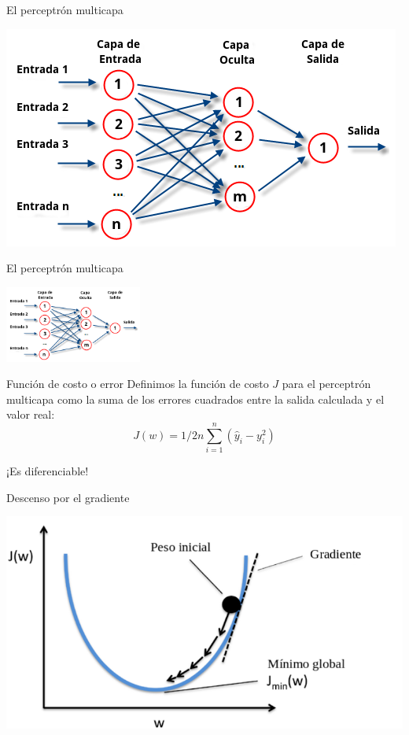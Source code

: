 \documentclass[presentation]{beamer}
\begin{document}
\begin{frame}[label={sec:org3d2b48a}]{El perceptrón multicapa}
\begin{center}
\includegraphics[width=.9\linewidth]{images/mlp.png}
\end{center}
\end{frame}
\begin{frame}[label={sec:orgd4aec04}]{El perceptrón multicapa}
\begin{center}
\includegraphics[width=170px]{images/mlp.png}
\end{center}
\begin{block}{Función de costo o error}
Definimos la función de costo \alert{\(J\)} para el perceptrón multicapa
como la suma de los errores cuadrados entre la salida calculada y
el valor real:
\begin{equation*}
J(w)=1/2n \sum_{i=1}^n (\hat{y}_i - y_i^2)
\end{equation*}

\pause
\begin{center}
¡Es diferenciable!
\end{center}
\end{block}
\end{frame}
\begin{frame}[label={sec:orgb7b2257}]{Descenso por el gradiente}
\begin{center}
\includegraphics[width=.9\linewidth]{images/gradient-descent.png}
\end{center}
\end{frame}
\end{document}

